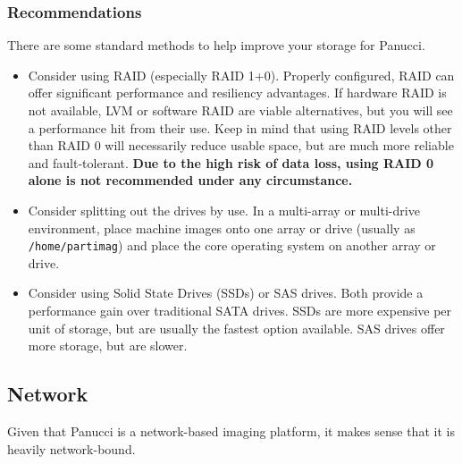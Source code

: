 \documentclass{article}
\def\code#1{\texttt{#1}}
\begin{document}
\begin{flushleft}
\subsubsection{Recommendations}
There are some standard methods to help improve your storage for Panucci.
\begin{itemize}
  \item Consider using RAID (especially RAID 1+0).  Properly configured, RAID can offer significant performance and resiliency advantages.  If hardware RAID is not available, LVM or software RAID are viable alternatives, but you will see a performance hit from their use.  Keep in mind that using RAID levels other than RAID 0 will necessarily reduce usable space, but are much more reliable and fault-tolerant.  \textbf{Due to the high risk of data loss, using RAID 0 alone is not recommended under any circumstance.}
  \item Consider splitting out the drives by use.  In a multi-array or multi-drive environment, place machine images onto one array or drive (usually as \code{/home/partimag}) and place the core operating system on another array or drive.
  \item Consider using Solid State Drives (SSDs) or SAS drives.  Both provide a performance gain over traditional SATA drives.  SSDs are more expensive per unit of storage, but are usually the fastest option available.  SAS drives offer more storage, but are slower.
\end{itemize}
\subsection{Network}
Given that Panucci is a network-based imaging platform, it makes sense that it is heavily network-bound.

\end{flushleft}
\end{document}
